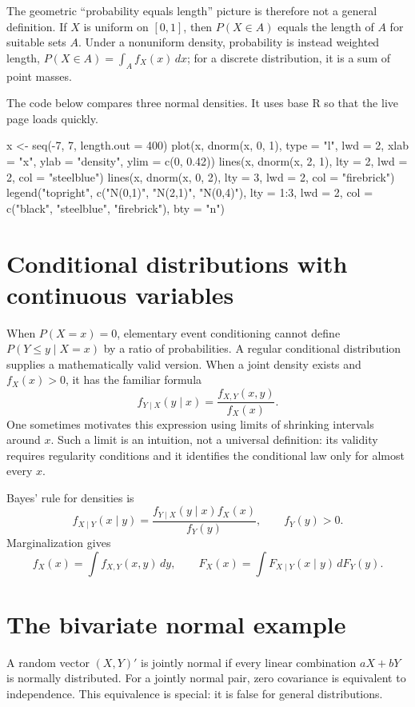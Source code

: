 The geometric ``probability equals length'' picture is therefore not a
general definition.  If $X$ is uniform on $[0,1]$, then
$P(X\in A)$ equals the length of $A$ for suitable sets $A$.  Under a
nonuniform density, probability is instead weighted length,
$P(X\in A)=\int_Af_X(x)\,dx$; for a discrete distribution, it is a sum of
point masses.

The code below compares three normal densities.  It uses base R so that the
live page loads quickly.

\begin{rcode}
x <- seq(-7, 7, length.out = 400)
plot(x, dnorm(x, 0, 1), type = "l", lwd = 2,
     xlab = "x", ylab = "density", ylim = c(0, 0.42))
lines(x, dnorm(x, 2, 1), lty = 2, lwd = 2, col = "steelblue")
lines(x, dnorm(x, 0, 2), lty = 3, lwd = 2, col = "firebrick")
legend("topright", c("N(0,1)", "N(2,1)", "N(0,4)"),
       lty = 1:3, lwd = 2,
       col = c("black", "steelblue", "firebrick"), bty = "n")
\end{rcode}

\section{Conditional distributions with continuous variables}

When $P(X=x)=0$, elementary event conditioning cannot define
$P(Y\leq y\mid X=x)$ by a ratio of probabilities.  A regular conditional
distribution supplies a mathematically valid version.  When a joint density
exists and $f_X(x)>0$, it has the familiar formula
\[
  f_{Y\mid X}(y\mid x)=\frac{f_{X,Y}(x,y)}{f_X(x)}.
\]
One sometimes motivates this expression using limits of shrinking intervals
around $x$.  Such a limit is an intuition, not a universal definition: its
validity requires regularity conditions and it identifies the conditional
law only for almost every $x$.

Bayes' rule for densities is
\[
  f_{X\mid Y}(x\mid y)
  =\frac{f_{Y\mid X}(y\mid x)f_X(x)}{f_Y(y)},
  \qquad f_Y(y)>0.
\]
Marginalization gives
\[
  f_X(x)=\int f_{X,Y}(x,y)\,dy,
  \qquad
  F_X(x)=\int F_{X\mid Y}(x\mid y)\,dF_Y(y).
\]

\section{The bivariate normal example}

A random vector $(X,Y)'$ is jointly normal if every linear combination
$aX+bY$ is normally distributed.  For a jointly normal pair, zero covariance
is equivalent to independence.  This equivalence is special: it is false for
general distributions.

